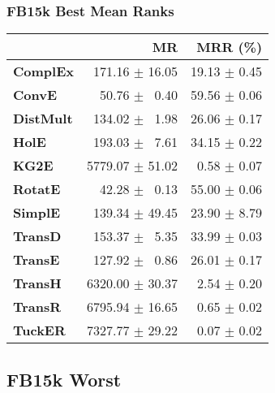 \documentclass{article}
\begin{document}
\subsubsection{FB15k Best Mean Ranks}
    \begin{center}
    \begin{tabular}{lrr}
\toprule
{} &               MR &      MRR (\%) \\
\midrule
\textbf{ComplEx } &  $\phantom{5}$171.16 $\pm$ 16.05 &  19.13 $\pm$ 0.45 \\
\textbf{ConvE   } &  $\phantom{5}$$\phantom{5}$50.76 $\pm$ $\phantom{5}$0.40 &  59.56 $\pm$ 0.06 \\
\textbf{DistMult} &  $\phantom{5}$134.02 $\pm$ $\phantom{5}$1.98 &  26.06 $\pm$ 0.17 \\
\textbf{HolE    } &  $\phantom{5}$193.03 $\pm$ $\phantom{5}$7.61 &  34.15 $\pm$ 0.22 \\
\textbf{KG2E    } &  5779.07 $\pm$ 51.02 &  $\phantom{5}$0.58 $\pm$ 0.07 \\
\textbf{RotatE  } &  $\phantom{5}$$\phantom{5}$42.28 $\pm$ $\phantom{5}$0.13 &  55.00 $\pm$ 0.06 \\
\textbf{SimplE  } &  $\phantom{5}$139.34 $\pm$ 49.45 &  23.90 $\pm$ 8.79 \\
\textbf{TransD  } &  $\phantom{5}$153.37 $\pm$ $\phantom{5}$5.35 &  33.99 $\pm$ 0.03 \\
\textbf{TransE  } &  $\phantom{5}$127.92 $\pm$ $\phantom{5}$0.86 &  26.01 $\pm$ 0.17 \\
\textbf{TransH  } &  6320.00 $\pm$ 30.37 &  $\phantom{5}$2.54 $\pm$ 0.20 \\
\textbf{TransR  } &  6795.94 $\pm$ 16.65 &  $\phantom{5}$0.65 $\pm$ 0.02 \\
\textbf{TuckER  } &  7327.77 $\pm$ 29.22 &  $\phantom{5}$0.07 $\pm$ 0.02 \\
\bottomrule
\end{tabular}

    \end{center}
\subsection{FB15k Worst}
\end{document}
